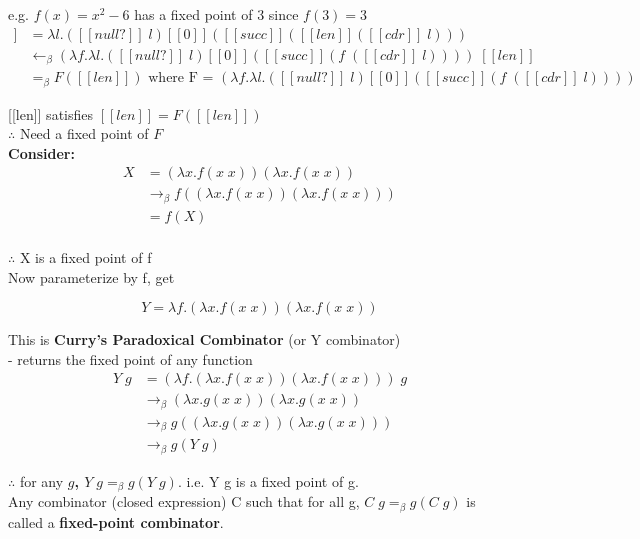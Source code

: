 \documentclass[11pt]{article}
\begin{document}
e.g. $f(x) = x^2 - 6$ has a fixed point of 3 since $f(3) = 3$ 
\begin{align*}
[[len]]&=\lambda l.([[null?]]\;l)[[0]]([[succ]]([[len]]([[cdr]]\;l)))\\
&\leftarrow_\beta (\lambda f.\lambda l.([[null?]]\;l)[[0]]([[succ]](f\;([[cdr]]\;l))))\;[[len]] \\
&=_\beta F([[len]])\text{     where F = $(\lambda f.\lambda l.([[null?]]\;l)[[0]]([[succ]](f\;([[cdr]]\;l))))$}
\end{align*}

[[len]] satisfies $[[len]] = F([[len]])$ \\

$\therefore$ Need a fixed point of $F$ \\

{\bf Consider:}
\begin{align*}
X &= (\lambda x.f(x\;x))(\lambda x.f(x\;x)) \\
&\rightarrow_\beta f((\lambda x.f(x\;x))(\lambda x.f(x\;x))) \\
&= f(X) \\
\end{align*}

$\therefore$ X is a fixed point of f \\

Now parameterize by f, get

$$Y = \lambda f.(\lambda x.f(x\;x))(\lambda x.f(x\;x))$$

This is {\bf Curry's Paradoxical Combinator} (or Y combinator) \\

- returns the fixed point of any function \\

\begin{align*}
Y\;g &= (\lambda f.(\lambda x.f(x\;x))(\lambda x.f(x\;x)))\;g \\
&\rightarrow_\beta (\lambda x.g(x\;x))(\lambda x.g(x\;x)) \\
&\rightarrow_\beta g((\lambda x.g(x\;x))(\lambda x.g(x\;x))) \\
&\rightarrow_\beta g(Y\;g) 
\end{align*}

$\therefore$ for any {\bf $g$, $Y\;g =_\beta g(Y\;g)$}. i.e. Y g is a fixed point of g. \\

Any combinator (closed expression) C such that for all g, $C\;g =_\beta g(C\;g)$ is called a {\bf fixed-point combinator}. \\
\end{document}
